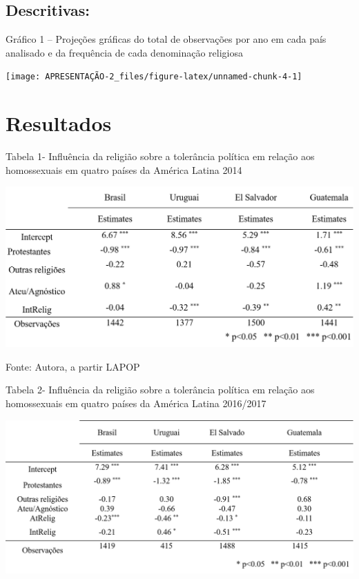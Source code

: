 \documentclass[
]{article}
\begin{document}
\hypertarget{descritivas}{%
\subsection{Descritivas:}\label{descritivas}}

Gráfico 1 -- Projeções gráficas do total de observações por ano em cada
país analisado e da frequência de cada denominação religiosa

\begin{center}\texttt{[image: APRESENTAÇÃO-2\_files/figure-latex/unnamed-chunk-4-1]} \end{center}

\vspace{5truemm}

\hypertarget{resultados}{%
\section{Resultados}\label{resultados}}

Tabela 1- Influência da religião sobre a tolerância política em relação
aos homossexuais em quatro países da América Latina 2014

\begin{center}\includegraphics[width=0.8\linewidth]{tabela1} \end{center}

Fonte: Autora, a partir LAPOP

Tabela 2- Influência da religião sobre a tolerância política em relação
aos homossexuais em quatro países da América Latina 2016/2017

\begin{center}\includegraphics[width=0.8\linewidth]{tabela2} \end{center}
\end{document}
